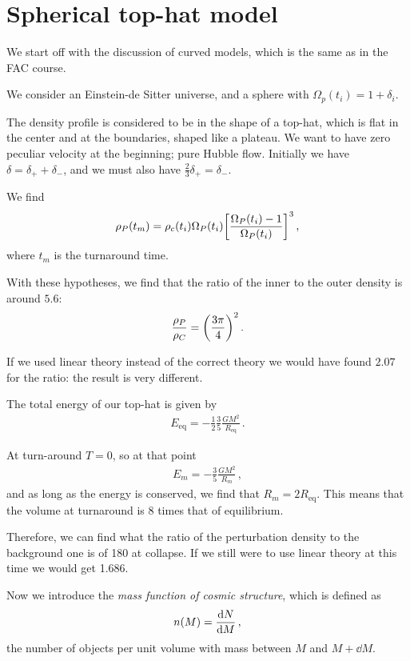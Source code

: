 \documentclass[main.tex]{subfiles}
\begin{document}
\section{Spherical top-hat model}

We start off with the discussion of curved models, which is the same as in the FAC course.

We consider an Einstein-de Sitter universe, and a sphere with \(\Omega_{p} (t_i) = 1 + \delta_{i}\).

The density profile is considered to be in the shape of a top-hat, which is flat in the center and at the boundaries, shaped like a plateau.
We want to have zero peculiar velocity at the beginning; pure Hubble flow.
Initially we have \(\delta = \delta_{+} + \delta_{-}\), and we must also have \( \frac{2}{3} \delta_{+} = \delta_{-}\).

We find 
%
\begin{align}
\rho_{P} (t_m) = \rho_{c} (t_i) \Omega_{P} (t_i) \qty[ \frac{\Omega_{P}(t_i) - 1}{\Omega_{P}(t_i)}]^3
\,,
\end{align}
%
where \(t_m\) is the turnaround time.

With these hypotheses, we find that the ratio of the inner to the outer density is around \(5.6\): 
%
\begin{align}
\frac{\rho_{P}}{\rho_{C}} = \qty( \frac{3 \pi }{4})^2
\,.
\end{align}

If we used linear theory instead of the correct theory we would have found \(2.07\) for the ratio: the result is very different. 

The total energy of our top-hat is given by 
%
\begin{align}
E _{\text{eq}} = - \frac{1}{2} \frac{3}{5} \frac{GM^2}{R _{\text{eq}}}
\,.
\end{align}

At turn-around \(T = 0\), so at that point 
%
\begin{align}
E_m = - \frac{3}{5} \frac{GM^2}{R_m}
\,,
\end{align}
%
and as long as the energy is conserved, we find that \(R_m = 2 R _{\text{eq}}\). 
This means that the volume at turnaround is 8 times that of equilibrium.

Therefore, we can find what the ratio of the perturbation density to the background one is of 180 at collapse.
If we still were to use linear theory at this time we would get \num{1.686}.

Now we introduce the \emph{mass function of cosmic structure}, which is defined as 
%
\begin{align}
n(M) = \dv{N}{M}
\,,
\end{align}
%
the number of objects per unit volume with mass between \(M \) and \(M + \dd{M}\). 
\end{document}
